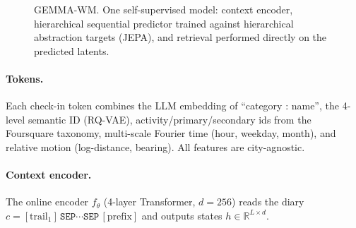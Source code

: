 \documentclass[10.5pt]{article}
\begin{document}
\begin{figure}[t]
\caption{GEMMA-WM. One self-supervised model: context encoder, hierarchical sequential predictor trained against
hierarchical abstraction targets (JEPA), and retrieval performed directly on the predicted latents.}
\label{fig:arch}
\end{figure}

\paragraph{Tokens.} Each check-in token combines the LLM embedding of ``category : name'', the 4-level semantic ID
(RQ-VAE), activity/primary/secondary ids from the Foursquare taxonomy, multi-scale Fourier time (hour, weekday,
month), and relative motion (log-distance, bearing). All features are city-agnostic.

\paragraph{Context encoder.} The online encoder $f_\theta$ (4-layer Transformer, $d{=}256$) reads the diary
$c=[\text{trail}_1]\,\texttt{SEP}\cdots\texttt{SEP}\,[\text{prefix}]$ and outputs states $h\in\mathbb{R}^{L\times d}$.
\end{document}
